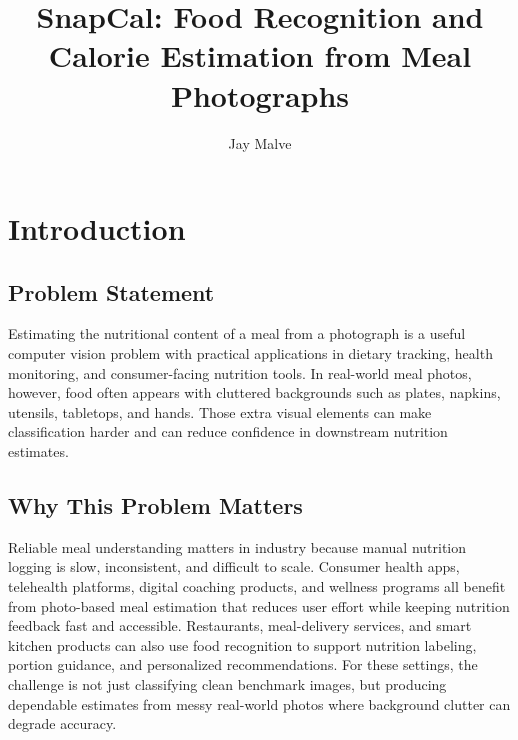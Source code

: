 \documentclass[sigconf,nonacm,11pt]{acmart}
\title{SnapCal: Food Recognition and Calorie Estimation from Meal Photographs}
\author{Jay Malve}
\affiliation{%
  \institution{University of Colorado Boulder}
}
\begin{document}
\maketitle

\section{Introduction}
\subsection{Problem Statement}
Estimating the nutritional content of a meal from a photograph is a useful computer vision problem with practical applications in dietary tracking, health monitoring, and consumer-facing nutrition tools. In real-world meal photos, however, food often appears with cluttered backgrounds such as plates, napkins, utensils, tabletops, and hands. Those extra visual elements can make classification harder and can reduce confidence in downstream nutrition estimates.

\subsection{Why This Problem Matters}
Reliable meal understanding matters in industry because manual nutrition logging is slow, inconsistent, and difficult to scale. Consumer health apps, telehealth platforms, digital coaching products, and wellness programs all benefit from photo-based meal estimation that reduces user effort while keeping nutrition feedback fast and accessible. Restaurants, meal-delivery services, and smart kitchen products can also use food recognition to support nutrition labeling, portion guidance, and personalized recommendations. For these settings, the challenge is not just classifying clean benchmark images, but producing dependable estimates from messy real-world photos where background clutter can degrade accuracy.
\end{document}
